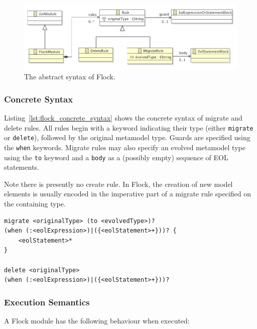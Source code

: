 \begin{figure}
  \centering
  \includegraphics[scale=0.75]{5.Implementation/flock_abstract_syntax.pdf}
  \caption{The abstract syntax of Flock.}
  \label{fig:abstract_syntax}
\end{figure}

\subsubsection{Concrete Syntax}
\label{subsubsec:concrete_syntax}

Listing~\ref{lst:flock_concrete_syntax} shows the concrete syntax of migrate and delete rules. All rules begin with a keyword indicating their type (either \texttt{migrate} or \texttt{delete}), followed by the original metamodel type. Guards are specified using the \texttt{when} keywords. Migrate rules may also specify an evolved metamodel type using the \texttt{to} keyword and a \texttt{body} as a (possibly empty) sequence of EOL statements.

Note there is presently no create rule. In Flock, the creation of new model elements is usually encoded in the imperative part of a migrate rule specified on the containing type.

\begin{lstlisting}[float=tbp, caption=Concrete syntax of migrate and delete rules., label=lst:flock_concrete_syntax, language=Flock]
migrate <originalType> (to <evolvedType>)?
(when (:<eolExpression>)|({<eolStatement>+}))? {
	<eolStatement>*
} 

delete <originalType>
(when (:<eolExpression>)|({<eolStatement>+}))?
\end{lstlisting}

\subsubsection{Execution Semantics}
A Flock module has the following behaviour when executed:

